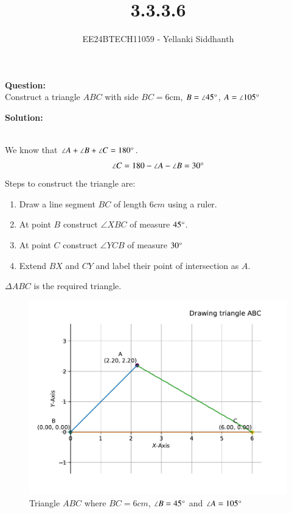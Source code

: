 \documentclass[journal]{IEEEtran}
\begin{document}
	
	
	\vspace{3cm}
	
	\title{3.3.3.6}
	\author{EE24BTECH11059 - Yellanki Siddhanth
	}
	{\let\newpage\relax\maketitle}
	
	\renewcommand{\thefigure}{\theenumi}
	\renewcommand{\thetable}{\theenumi}
	\setlength{\intextsep}{10pt} %
	
	
	\renewcommand{\thetable}{\theenumi}
	
\textbf{Question: }\\
Construct a triangle $ABC$ with side $BC = 6$cm, $B = \angle45\degree$, $A = \angle105\degree$

\textbf{Solution: } \\
\begin{table}[h!]    
	\centering
	
	\caption{}
\end{table}\\
We know that $ \angle A + \angle B + \angle C = 180\degree $.\\
	\begin{align}
		\angle C = 180 - \angle A - \angle B = 30\degree
	\end{align}
	Steps to construct the triangle are:
	\begin{enumerate}
		\item Draw a line segment $BC$ of length $6cm$ using a ruler.
		\item At point $B$ construct $\angle XBC$ of measure $45 \degree$.
		\item At point $C$ construct $\angle YCB$ of measure $30 \degree$
		\item Extend $BX$ and $CY$ and label their point of intersection as $A$.
	\end{enumerate} 
	
	$\Delta ABC$ is the required triangle.
	\begin{figure}[h!]
		\centering
		\includegraphics[width=0.7\linewidth]{figs/fig.pdf}
		\caption{Triangle $ABC$ where $BC=6cm$, $\angle B = 45 \degree$ and $\angle A = 105 \degree$}
	\end{figure}
	
	
\end{document}
